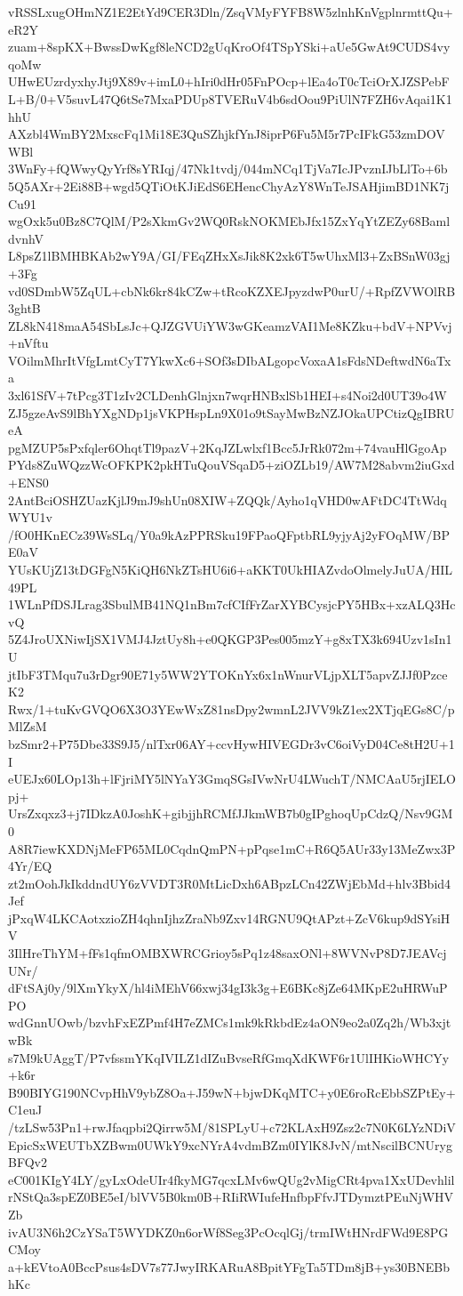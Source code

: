 vRSSLxugOHmNZ1E2EtYd9CER3Dln/ZsqVMyFYFB8W5zlnhKnVgplnrmttQu+eR2Y
zuam+8spKX+BwssDwKgf8leNCD2gUqKroOf4TSpYSki+aUe5GwAt9CUDS4vyqoMw
UHwEUzrdyxhyJtj9X89v+imL0+hIri0dHr05FnPOcp+lEa4oT0cTciOrXJZSPebF
L+B/0+V5suvL47Q6tSe7MxaPDUp8TVERuV4b6sdOou9PiUlN7FZH6vAqai1K1hhU
AXzbl4WmBY2MxscFq1Mi18E3QuSZhjkfYnJ8iprP6Fu5M5r7PcIFkG53zmDOVWBl
3WnFy+fQWwyQyYrf8sYRIqj/47Nk1tvdj/044mNCq1TjVa7IcJPvznIJbLlTo+6b
5Q5AXr+2Ei88B+wgd5QTiOtKJiEdS6EHencChyAzY8WnTeJSAHjimBD1NK7jCu91
wgOxk5u0Bz8C7QlM/P2sXkmGv2WQ0RskNOKMEbJfx15ZxYqYtZEZy68BamldvnhV
L8psZ1lBMHBKAb2wY9A/GI/FEqZHxXsJik8K2xk6T5wUhxMl3+ZxBSnW03gj+3Fg
vd0SDmbW5ZqUL+cbNk6kr84kCZw+tRcoKZXEJpyzdwP0urU/+RpfZVWOlRB3ghtB
ZL8kN418maA54SbLsJc+QJZGVUiYW3wGKeamzVAI1Me8KZku+bdV+NPVvj+nVftu
VOilmMhrItVfgLmtCyT7YkwXc6+SOf3sDIbALgopcVoxaA1sFdsNDeftwdN6aTxa
3xl61SfV+7tPcg3T1zIv2CLDenhGlnjxn7wqrHNBxlSb1HEI+s4Noi2d0UT39o4W
ZJ5gzeAvS9lBhYXgNDp1jsVKPHspLn9X01o9tSayMwBzNZJOkaUPCtizQgIBRUeA
pgMZUP5sPxfqler6OhqtTl9pazV+2KqJZLwlxf1Bcc5JrRk072m+74vauHlGgoAp
PYds8ZuWQzzWcOFKPK2pkHTuQouVSqaD5+ziOZLb19/AW7M28abvm2iuGxd+ENS0
2AntBciOSHZUazKjlJ9mJ9shUn08XIW+ZQQk/Ayho1qVHD0wAFtDC4TtWdqWYU1v
/fO0HKnECz39WsSLq/Y0a9kAzPPRSku19FPaoQFptbRL9yjyAj2yFOqMW/BPE0aV
YUsKUjZ13tDGFgN5KiQH6NkZTsHU6i6+aKKT0UkHIAZvdoOlmelyJuUA/HIL49PL
1WLnPfDSJLrag3SbulMB41NQ1nBm7cfCIfFrZarXYBCysjcPY5HBx+xzALQ3HcvQ
5Z4JroUXNiwIjSX1VMJ4JztUy8h+e0QKGP3Pes005mzY+g8xTX3k694Uzv1sIn1U
jtIbF3TMqu7u3rDgr90E71y5WW2YTOKnYx6x1nWnurVLjpXLT5apvZJJf0PzceK2
Rwx/1+tuKvGVQO6X3O3YEwWxZ81nsDpy2wmnL2JVV9kZ1ex2XTjqEGs8C/pMlZsM
bzSmr2+P75Dbe33S9J5/nlTxr06AY+ccvHywHIVEGDr3vC6oiVyD04Ce8tH2U+1I
eUEJx60LOp13h+lFjriMY5lNYaY3GmqSGsIVwNrU4LWuchT/NMCAaU5rjIELOpj+
UrsZxqxz3+j7IDkzA0JoshK+gibjjhRCMfJJkmWB7b0gIPghoqUpCdzQ/Nsv9GM0
A8R7iewKXDNjMeFP65ML0CqdnQmPN+pPqse1mC+R6Q5AUr33y13MeZwx3P4Yr/EQ
zt2mOohJkIkddndUY6zVVDT3R0MtLicDxh6ABpzLCn42ZWjEbMd+hlv3Bbid4Jef
jPxqW4LKCAotxzioZH4qhnIjhzZraNb9Zxv14RGNU9QtAPzt+ZcV6kup9dSYsiHV
3IlHreThYM+fFs1qfmOMBXWRCGrioy5sPq1z48saxONl+8WVNvP8D7JEAVcjUNr/
dFtSAj0y/9lXmYkyX/hl4iMEhV66xwj34gI3k3g+E6BKc8jZe64MKpE2uHRWuPPO
wdGnnUOwb/bzvhFxEZPmf4H7eZMCs1mk9kRkbdEz4aON9eo2a0Zq2h/Wb3xjtwBk
s7M9kUAggT/P7vfssmYKqIVILZ1dIZuBvseRfGmqXdKWF6r1UlIHKioWHCYy+k6r
B90BIYG190NCvpHhV9ybZ8Oa+J59wN+bjwDKqMTC+y0E6roRcEbbSZPtEy+C1euJ
/tzLSw53Pn1+rwJfaqpbi2Qirrw5M/81SPLyU+c72KLAxH9Zsz2c7N0K6LYzNDiV
EpicSxWEUTbXZBwm0UWkY9xcNYrA4vdmBZm0IYlK8JvN/mtNscilBCNUrygBFQv2
eC001KIgY4LY/gyLxOdeUIr4fkyMG7qcxLMv6wQUg2vMigCRt4pva1XxUDevhlil
rNStQa3spEZ0BE5eI/blVV5B0km0B+RIiRWIufeHnfbpFfvJTDymztPEuNjWHVZb
ivAU3N6h2CzYSaT5WYDKZ0n6orWf8Seg3PcOcqlGj/trmIWtHNrdFWd9E8PGCMoy
a+kEVtoA0BccPsus4sDV7s77JwyIRKARuA8BpitYFgTa5TDm8jB+ys30BNEBbhKc
